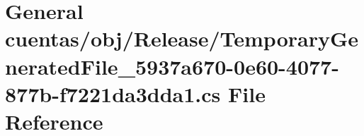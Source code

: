 \hypertarget{_general_01cuentas_2obj_2_release_2_temporary_generated_file__5937a670-0e60-4077-877b-f7221da3dda1_8cs}{\section{General cuentas/obj/\-Release/\-Temporary\-Generated\-File\-\_\-5937a670-\/0e60-\/4077-\/877b-\/f7221da3dda1.cs File Reference}
\label{_general_01cuentas_2obj_2_release_2_temporary_generated_file__5937a670-0e60-4077-877b-f7221da3dda1_8cs}
}
